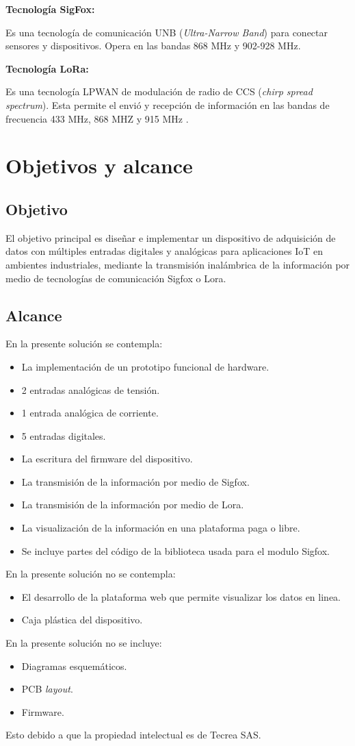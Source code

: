 \textbf{Tecnología SigFox:} 

Es una tecnología de comunicación UNB (\textit{Ultra-Narrow Band}) para conectar sensores y dispositivos. Opera en las bandas 868 MHz y 902-928 MHz.

\textbf{Tecnología LoRa:} 

Es una tecnología LPWAN de modulación de radio de CCS (\textit{chirp spread spectrum}). Esta permite el envió y recepción de información en las bandas de frecuencia 433 MHz, 868 MHZ y 915 MHz .

\section{Objetivos y alcance}

\subsection{Objetivo}
El objetivo principal es diseñar e implementar un dispositivo de adquisición de datos con múltiples entradas digitales y analógicas para aplicaciones IoT en ambientes industriales, mediante la transmisión inalámbrica de la información por medio de tecnologías de comunicación Sigfox o Lora. 

\subsection{Alcance}

En la presente solución se contempla:


\begin{itemize}
	\item La implementación de un prototipo funcional de hardware.
	\item 2 entradas analógicas de tensión.
	\item 1 entrada analógica de corriente.
	\item 5 entradas digitales.
	\item La escritura del firmware del dispositivo.
	\item La transmisión de la información por medio de Sigfox.
	\item La transmisión de la información por medio de Lora.
	\item La visualización de la información en una plataforma paga o libre.
	\item Se incluye partes del código de la biblioteca usada para el modulo Sigfox.
\end{itemize}
En la presente solución no se contempla:
\begin{itemize}
	\item El desarrollo de la plataforma web que permite visualizar los datos en linea.
	\item Caja plástica del dispositivo.
\end{itemize}
En la presente solución no se incluye:
\begin{itemize}
	\item Diagramas esquemáticos.
	\item PCB \textit{layout}.
	\item Firmware.
\end{itemize}

Esto debido a que la propiedad intelectual es de Tecrea SAS.



